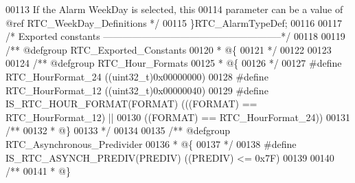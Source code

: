 \begin{DoxyCode}
00113 \textcolor{comment}{                                     If the Alarm WeekDay is selected, this }
00114 \textcolor{comment}{                                     parameter can be a value of @ref RTC\_WeekDay\_Definitions */}
00115 \}RTC\_AlarmTypeDef;
00116 
00117 \textcolor{comment}{/* Exported constants --------------------------------------------------------*/}
00118 
00119 \textcolor{comment}{/** @defgroup RTC\_Exported\_Constants}
00120 \textcolor{comment}{  * @\{}
00121 \textcolor{comment}{  */}
00122 
00123 
00124 \textcolor{comment}{/** @defgroup RTC\_Hour\_Formats }
00125 \textcolor{comment}{  * @\{}
00126 \textcolor{comment}{  */}
00127 \textcolor{preprocessor}{#}\textcolor{preprocessor}{define} \textcolor{preprocessor}{RTC\_HourFormat\_24}              \textcolor{preprocessor}{(}\textcolor{preprocessor}{(}\textcolor{preprocessor}{uint32\_t}\textcolor{preprocessor}{)}0x00000000\textcolor{preprocessor}{)}
00128 \textcolor{preprocessor}{#}\textcolor{preprocessor}{define} \textcolor{preprocessor}{RTC\_HourFormat\_12}              \textcolor{preprocessor}{(}\textcolor{preprocessor}{(}\textcolor{preprocessor}{uint32\_t}\textcolor{preprocessor}{)}0x00000040\textcolor{preprocessor}{)}
00129 \textcolor{preprocessor}{#}\textcolor{preprocessor}{define} \textcolor{preprocessor}{IS\_RTC\_HOUR\_FORMAT}\textcolor{preprocessor}{(}\textcolor{preprocessor}{FORMAT}\textcolor{preprocessor}{)}     \textcolor{preprocessor}{(}\textcolor{preprocessor}{(}\textcolor{preprocessor}{(}\textcolor{preprocessor}{FORMAT}\textcolor{preprocessor}{)} \textcolor{preprocessor}{==} RTC_HourFormat_12\textcolor{preprocessor}{)} \textcolor{preprocessor}{||}
00130                                         \textcolor{preprocessor}{(}\textcolor{preprocessor}{(}\textcolor{preprocessor}{FORMAT}\textcolor{preprocessor}{)} \textcolor{preprocessor}{==} RTC_HourFormat_24\textcolor{preprocessor}{)}\textcolor{preprocessor}{)}
00131 \textcolor{comment}{/**}
00132 \textcolor{comment}{  * @\}}
00133 \textcolor{comment}{  */}
00134 
00135 \textcolor{comment}{/** @defgroup RTC\_Asynchronous\_Predivider }
00136 \textcolor{comment}{  * @\{}
00137 \textcolor{comment}{  */}
00138 \textcolor{preprocessor}{#}\textcolor{preprocessor}{define} \textcolor{preprocessor}{IS\_RTC\_ASYNCH\_PREDIV}\textcolor{preprocessor}{(}\textcolor{preprocessor}{PREDIV}\textcolor{preprocessor}{)}   \textcolor{preprocessor}{(}\textcolor{preprocessor}{(}\textcolor{preprocessor}{PREDIV}\textcolor{preprocessor}{)} \textcolor{preprocessor}{<=} 0x7F\textcolor{preprocessor}{)}
00139 
00140 \textcolor{comment}{/**}
00141 \textcolor{comment}{  * @\}}

\end{DoxyCode}
